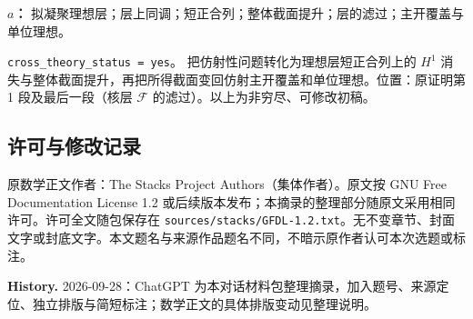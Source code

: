 \documentclass[UTF8,11pt]{ctexart}
\begin{document}
\textbf{$a$：} 拟凝聚理想层；层上同调；短正合列；整体截面提升；层的滤过；主开覆盖与单位理想。

\texttt{cross\_theory\_status = yes}。
把仿射性问题转化为理想层短正合列上的 $H^1$ 消失与整体截面提升，再把所得截面变回仿射主开覆盖和单位理想。位置：原证明第 1 段及最后一段（核层 $\mathcal F$ 的滤过）。以上为非穷尽、可修改初稿。
\subsection*{许可与修改记录}
原数学正文作者：The Stacks Project Authors（集体作者）。原文按 GNU Free Documentation License 1.2 或后续版本发布；本摘录的整理部分随原文采用相同许可。许可全文随包保存在 \texttt{sources/stacks/GFDL-1.2.txt}。无不变章节、封面文字或封底文字。本文题名与来源作品题名不同，不暗示原作者认可本次选题或标注。

\textbf{History.} 2026-09-28：ChatGPT 为本对话材料包整理摘录，加入题号、来源定位、独立排版与简短标注；数学正文的具体排版变动见整理说明。
\end{document}
